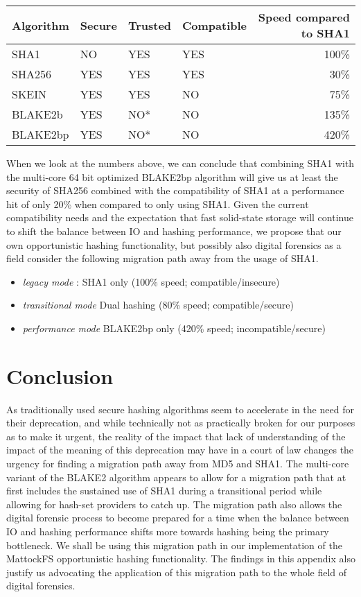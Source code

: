 \begin{table}[]
\centering
\begin{tabular}{llllr}
Algorithm & Secure & Trusted & Compatible & Speed compared to SHA1 \\ \hline
SHA1 & NO & YES & YES & 100\% \\
SHA256 & YES & YES & YES & 30\% \\
SKEIN & YES & YES & NO & 75\% \\
BLAKE2b & YES & NO* & NO & 135\% \\
BLAKE2bp & YES & NO* & NO & 420\% \\
\end{tabular}
\end{table}
When we look at the numbers above, we can conclude that combining SHA1 with the multi-core 64 bit optimized BLAKE2bp algorithm will give us at least the security of SHA256 combined with the compatibility of SHA1 at a performance hit of only 20\% when compared to only using SHA1.
Given the current compatibility needs and the expectation that fast solid-state storage will continue to shift the balance between IO and hashing performance, we propose that our own opportunistic hashing functionality, but possibly also digital forensics as a field consider the following migration path away from the usage of SHA1.
\begin{itemize}
\item \emph{legacy mode} : SHA1 only (100\% speed; compatible/insecure)
\item \emph{transitional mode} Dual hashing (80\% speed; compatible/secure)
\item \emph{performance mode} BLAKE2bp only (420\% speed; incompatible/secure)
\end{itemize}
\section{Conclusion}
As traditionally used secure hashing algorithms seem to accelerate in the need for their deprecation, and while technically not as practically broken for our purposes as to make it urgent, the reality of the impact that lack of understanding of the impact of the meaning of this deprecation may have in a court of law changes the urgency for finding a migration path away from MD5 and SHA1. The multi-core variant of the BLAKE2 algorithm appears to allow for a migration path that at first includes the sustained use of SHA1 during a transitional period while allowing for hash-set providers to catch up. The migration path also allows the digital forensic process to become prepared for a time when the balance between IO and hashing performance shifts more towards hashing being the primary bottleneck.  We shall be using this migration path in our implementation of the MattockFS opportunistic hashing functionality. The findings in this appendix also justify us advocating the application of this migration path to the whole field of digital forensics. 
